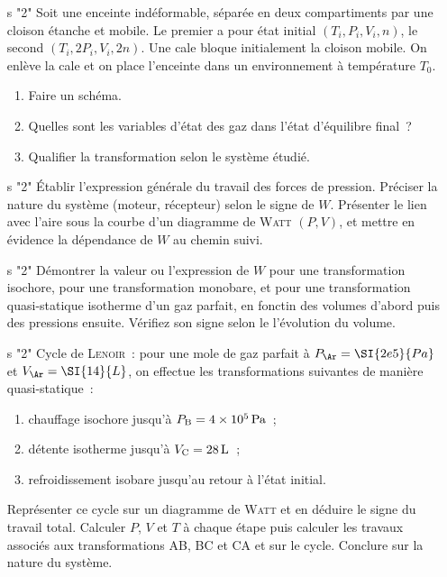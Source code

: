 \documentclass[a4paper, 11pt, final, garamond]{book}
\begin{document}
\begin{enumerate}[label=\sqenumi]
	\item[s]"2"
	Soit une enceinte indéformable, séparée en deux compartiments par une
	cloison étanche et mobile. Le premier a pour état initial $(T_i,P_i,V_i,n)$,
	le second $(T_i,2P_i,V_i,2n)$. Une cale bloque initialement la cloison
	mobile. On enlève la cale et on place l'enceinte dans un environnement à
	température $T_0$.
	\begin{enumerate}[label=\alph*)]
		\item Faire un schéma.
		\item Quelles sont les variables d'état des gaz dans l'état
		      d'équilibre final~?
		\item Qualifier la transformation selon le système étudié.
	\end{enumerate}

	\item[s]"2"
	Établir l'expression générale du travail des forces de pression.
	Préciser la nature du système (moteur, récepteur) selon le signe de $W$.
	Présenter le lien avec l'aire sous la courbe d'un diagramme de
	\textsc{Watt} $(P,V)$, et mettre en évidence la dépendance de $W$ au
	chemin suivi.

	\item[s]"2"
	Démontrer la valeur ou l'expression de $W$ pour une
	transformation isochore, pour une transformation monobare, et pour une
	transformation quasi-statique isotherme d'un gaz parfait, en fonctin des
	volumes d'abord puis des pressions ensuite. Vérifiez son signe selon le
	l'évolution du volume.

	\item[s]"2"
	Cycle de \textsc{Lenoir}~: pour une mole de gaz parfait à $P_\Ar =
		\SI{2e5}{Pa}$ et $V_\Ar = \SI{14}{L}$, on effectue les transformations
	suivantes de manière quasi-statique~:
	\begin{enumerate}[label=\alph*)]
		\item chauffage isochore jusqu'à $P_{\rm B} = \SI{4e5}{Pa}$~;
		\item détente isotherme jusqu'à $V_{\rm C} = \SI{28}{L}$~;
		\item refroidissement isobare jusqu'au retour à l'état initial.
	\end{enumerate}
	Représenter ce cycle sur un diagramme de \textsc{Watt} et en déduire le
	signe du travail total. Calculer $P$, $V$ et $T$ à chaque étape puis
	calculer les travaux associés aux transformations AB, BC et CA et sur le
	cycle. Conclure sur la nature du système.
\end{enumerate}
\end{document}
